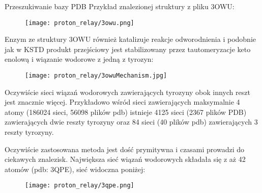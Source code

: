 \documentclass[10pt,a4paper]{article}
\begin{document}
\begin{section}{Przeszukiwanie bazy PDB}
 Przykład znalezionej struktury z pliku 3OWU:
 
  \begin{figure}[H]
  \texttt{[image: proton\_relay/3owu.png]}
\end{figure}

Enzym ze struktury 3OWU również katalizuje reakcje odworodnienia i podobnie jak w KSTD produkt przejściowy jest stabilizowany przez tautomeryzacje keto enolową i wiązanie wodorowe z jedną z tyrozyn:

 \begin{figure}[H]
  \texttt{[image: proton\_relay/3owuMechanism.jpg]}
\end{figure}


Oczywiście sieci wiązań wodorowych zawierających tyrozyny obok innych reszt jest znacznie więcej. Przykładowo wśród sieci zawierających maksymalnie 4 atomy (186024 sieci, 56098 plików pdb) istnieje 
4125 sieci (2367 plików PDB) zawierających dwie reszty tyrozyny oraz 84 sieci (40 plików pdb) zawierających 3 reszty tyrozyny. 
 
 Oczywiście zastosowana metoda jest dość prymitywna i czasami prowadzi do ciekawych znalezisk. Największa sieć wiązań wodorowych składała się z aż 42 atomów (pdb: 3QPE), sieć widoczna poniżej:
 
   \begin{figure}[H]
  \texttt{[image: proton\_relay/3qpe.png]}
\end{figure}
 
\end{section}
\end{document}
